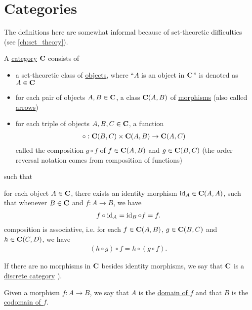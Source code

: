\section{Categories}\label{sec:categories}

\begin{note}
  The definitions here are somewhat informal because of set-theoretic difficulties (see \cref{ch:set_theory}).
\end{note}

\begin{definition}\label{def:category}\cite[definition 1.1.1]{Leinster2014}
  A \uline{category} $\operatorname{\mathbf{C}}$ consists of
  \begin{itemize}
    \item a set-theoretic class of \uline{objects}, where \enquote{$A$ is an object in $\operatorname{\mathbf{C}}$} is denoted as $A \in \operatorname{\mathbf{C}}$
    \item for each pair of objects $A, B \in \operatorname{\mathbf{C}}$, a class ${\operatorname{\mathbf{C}}}(A, B)$ of \uline{morphisms} (also called \uline{arrows})
    \item for each triple of objects $A, B, C \in \operatorname{\mathbf{C}}$, a function
    \begin{align*}
      \circ: {\operatorname{\mathbf{C}}}(B, C) \times {\operatorname{\mathbf{C}}}(A, B) \to {\operatorname{\mathbf{C}}}(A, C)
    \end{align*}
    called the composition $g \circ f$ of $f \in {\operatorname{\mathbf{C}}}(A, B)$ and $g \in {\operatorname{\mathbf{C}}}(B, C)$ (the order reversal notation comes from composition of functions)
  \end{itemize}
  such that
  \begin{description}
     for each object $A \in \operatorname{\mathbf{C}}$, there exists an identity morphism $\operatorname{id}_A \in {\operatorname{\mathbf{C}}}(A, A)$, such that whenever $B \in \operatorname{\mathbf{C}}$ and $f: A \to B$, we have
    \begin{align*}
      f \circ \operatorname{id}_A = \operatorname{id}_B \circ f = f.
    \end{align*}
     composition is associative, i.e. for each $f \in {\operatorname{\mathbf{C}}}(A, B)$, $g \in {\operatorname{\mathbf{C}}}(B, C)$ and $h \in {\operatorname{\mathbf{C}}}(C, D)$, we have
    \begin{align*}
      (h \circ g) \circ f = h \circ (g \circ f).
    \end{align*}
  \end{description}

  If there are no morphisms in $\operatorname{\mathbf{C}}$ besides identity morphisms, we say that $\operatorname{\mathbf{C}}$ is a \uline{discrete category} \cite[example 1.1.18(b]{Leinster2014}).

  Given a morphism $f: A \to B$, we say that $A$ is the \uline{domain of $f$} and that $B$ is the \uline{codomain of $f$}.
\end{definition}

